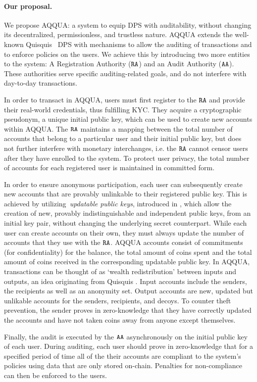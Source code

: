 \paragraph*{Our proposal.}
We propose AQQUA: a system to equip DPS with auditability, without changing its decentralized, permissionless, and trustless nature. 
AQQUA extends the well-known Quisquis~\cite{fauzi2019quisquis} DPS with mechanisms to allow the auditing of transactions and to enforce policies on the users.
We achieve this by introducing two more entities to the system: A Registration Authority ($\RA$) and an Audit Authority ($\AA$). 
These authorities serve specific auditing-related goals, and do not interfere with day-to-day transactions.

In order to transact in AQQUA, users must first register to the $\RA$ and provide their real-world credentials, thus fulfilling KYC.
They acquire a cryptographic pseudonym, a unique initial public key, which can be used to create new accounts within AQQUA.
The $\RA$ maintains a mapping between the total number of accounts that belong to a particular user and their initial public key, but does not further interfere with monetary interchanges, i.e. the $\RA$ cannot censor users after they have enrolled to the system.
To protect user privacy, the total number of accounts for each registered user is maintained in committed form. 

In order to ensure anonymous participation, each user can subsequently create new accounts that are provably unlinkable to their registered public key. 
This is achieved by utilizing~\emph{updatable public keys}, introduced in \cite{fauzi2019quisquis}, which allow the creation of new, provably indistinguishable and independent public keys, from an initial key pair, without changing the underlying secret counterpart.
While each user can create accounts on their own, they must always update the number of accounts that they use with the $\RA$. 
AQQUA accounts consist of commitments (for confidentiality) for the balance, the total amount of coins spent and the total amount of coins received in the corresponding updatable public key. 
In AQQUA, transactions can be thought of as `wealth redistribution' between inputs and outputs, an idea originating from Quisquis \cite{fauzi2019quisquis}. Input accounts include the senders, the recipients as well as an anonymity set. 
Output accounts are new, updated but unlikable accounts for the senders, recipients, and decoys. 
To counter theft prevention, the sender proves in zero-knowledge that they have correctly updated the accounts and have not taken coins away from anyone except themselves.

Finally, the audit is executed by the $\AA$ asynchronously on the initial public key of each user. 
During auditing, each user should prove in zero-knowledge that for a specified period of time all of the their accounts are compliant to the system's policies using data that are only stored on-chain. 
Penalties for non-compliance can then be enforced to the users.